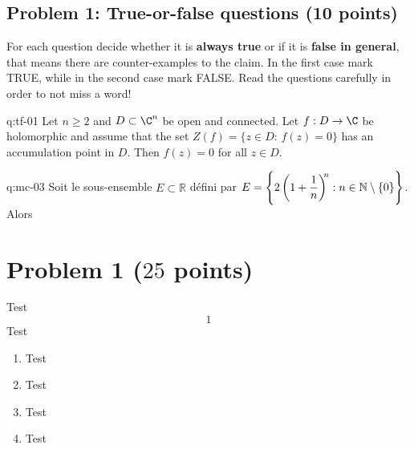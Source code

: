 \documentclass[a4paper]{article}%
\begin{document}
\newpage

\subsection*{Problem 1: True-or-false questions (10 points)}

\noindent
For each question decide whether it is \textbf{always true} or if it is \textbf{false in general}, that means there are counter-examples to the claim. In the first case mark TRUE, while in the second case mark FALSE. Read the questions carefully in order to not miss a word!
\bigskip

\begin{question}{q:tf-01}
Let $n\geq 2$ and $D\subset\C^n$ be open and connected. Let $f:D\to\C$ be holomorphic and assume that the set $Z(f)=\{z\in D:\,f(z)=0\}$ has an accumulation point in $D$. Then $f(z)=0$ for all $z\in D$. 
\FALSE
\end{question}

\begin{questionmult}{q:mc-03}
Soit le sous-ensemble $E\subset \mathbb{R}$ d\'efini par
$\displaystyle E=\Bigg\{2\left(1+\frac 1 n\right)
^{\hspace{-1mm}n}: n\in \mathbb{N}\setminus\{0\}\Bigg\}$. 
\\Alors
\begin{reponses}
\end{reponses}
\end{questionmult}










\section*{Problem 1 ($25$ points)} 
Test
\begin{equation*}
  1
\end{equation*}
Test

\begin{enumerate}[label=(\alph*)]
  \item 
  Test
  \item
  Test
  \item 
  Test
  \item 
  Test
\end{enumerate}
\end{document}
